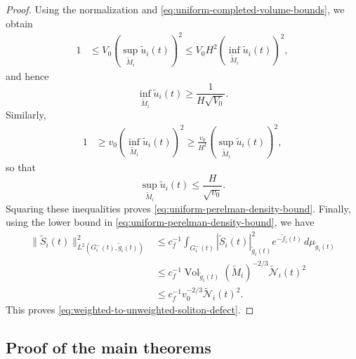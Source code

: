\documentclass{amsart}
\begin{document}
\begin{proof}
\noindent Using the normalization and
\eqref{eq:uniform-completed-volume-bounds}, we obtain
\[
\begin{split}
        1
        &\leq
        V_0
        \left(
        \sup_{\widetilde M_i}\widetilde u_i(t)
        \right)^2
        \leq
        V_0H^2
        \left(
        \inf_{\widetilde M_i}\widetilde u_i(t)
        \right)^2,
\end{split}
\]
and hence
\[
        \inf_{\widetilde M_i}\widetilde u_i(t)
        \geq
        \frac{1}{H\sqrt{V_0}}.
\]
Similarly,
\[
\begin{split}
        1
        &\geq
        v_0
        \left(
        \inf_{\widetilde M_i}\widetilde u_i(t)
        \right)^2
        \geq
        \frac{v_0}{H^2}
        \left(
        \sup_{\widetilde M_i}\widetilde u_i(t)
        \right)^2,
\end{split}
\]
so that
\[
        \sup_{\widetilde M_i}\widetilde u_i(t)
        \leq
        \frac{H}{\sqrt{v_0}}.
\]
Squaring these inequalities proves
\eqref{eq:uniform-perelman-density-bound}. Finally, using the lower bound in
\eqref{eq:uniform-perelman-density-bound}, we have
\[
\begin{split}
        \|\widetilde S_i(t)\|_
        {L^2(G_i^-(t),\widetilde g_i(t))}^2
        &\leq
        c_f^{-1}
        \int_{G_i^-(t)}
        |\widetilde S_i(t)|_{\widetilde g_i(t)}^2
        e^{-\widetilde f_i(t)}
        \,d\mu_{\widetilde g_i(t)}
        \\
        &\leq
        c_f^{-1}
        \operatorname{Vol}_{\widetilde g_i(t)}
        (\widetilde M_i)^{-2/3}
        \widetilde{\mathcal N}_i(t)^2
        \\
        &\leq
        c_f^{-1}v_0^{-2/3}
        \widetilde{\mathcal N}_i(t)^2.
\end{split}
\]
This proves
\eqref{eq:weighted-to-unweighted-soliton-defect}.
\end{proof}



\subsection{Proof of the main theorems}
\label{subsec:proof-main-theorems}
\end{document}

